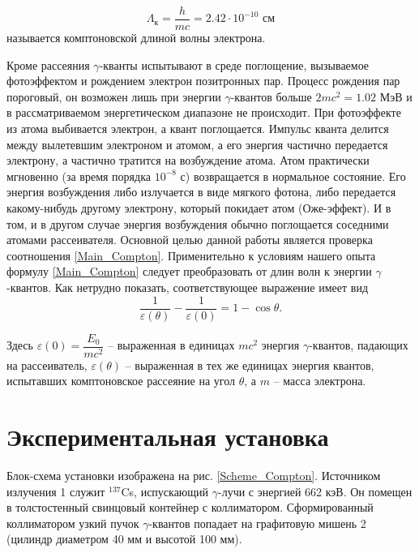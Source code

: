 \documentclass[12pt,a4paper]{article}
\begin{document}
	\begin{equation*}
		\Lambda_\text{к} = \frac{h}{mc} = 2.42 \cdot 10^{-10} \text{ см}
	\end{equation*}
	называется комптоновской длиной волны электрона.
 
 
 	Кроме рассеяния $\gamma$-кванты испытывают в среде поглощение, вызываемое фотоэффектом и рождением электрон позитронных пар. Процесс рождения пар пороговый, он возможен лишь при энергии $\gamma$-квантов больше $2mc^2 = 1.02$ МэВ и в рассматриваемом энергетическом диапазоне не происходит. При фотоэффекте из атома выбивается электрон, а квант поглощается. Импульс кванта делится между вылетевшим электроном и атомом, а его энергия частично передается электрону, а частично тратится на возбуждение атома. Атом практически мгновенно (за время порядка $10^{-8}$ с) возвращается в нормальное состояние. Его энергия возбуждения либо излучается в виде мягкого фотона, либо передается какому-нибудь другому электрону, который покидает атом (Оже-эффект). И в том, и в другом случае энергия возбуждения обычно поглощается соседними атомами рассеивателя. Основной целью данной работы является проверка соотношения \eqref{Main_Compton}. Применительно к условиям нашего опыта формулу \eqref{Main_Compton} следует преобразовать от длин волн к энергии $\gamma$-квантов. Как нетрудно показать, соответствующее выражение имеет вид
 	\begin{equation}
 		\frac{1}{\varepsilon(\theta)} - \frac{1}{\varepsilon(0)} = 1 - \cos\theta.
 		\label{Energy_Compton}
 	\end{equation}
 
 	Здесь $\varepsilon(0) = \dfrac{E_0}{mc^2}$ -- выраженная в единицах $mc^2$ энергия $\gamma$-квантов, падающих на рассеиватель, $\varepsilon(\theta)$ -- выраженная в тех же единицах энергия квантов, испытавших комптоновское рассеяние на угол $\theta$, а $m$ -- масса электрона.
 	
 
	\section*{Экспериментальная установка}
	
	Блок-схема установки изображена на рис. \ref{Scheme_Compton}. Источником излучения 1 служит $^{137}$Cs, испускающий $\gamma$-лучи с энергией 662 кэВ. Он помещен в толстостенный свинцовый контейнер с коллиматором. Сформированный коллиматором узкий пучок $\gamma$-квантов попадает на графитовую мишень 2 (цилиндр диаметром 40 мм и высотой 100 мм).
 	
\end{document}
